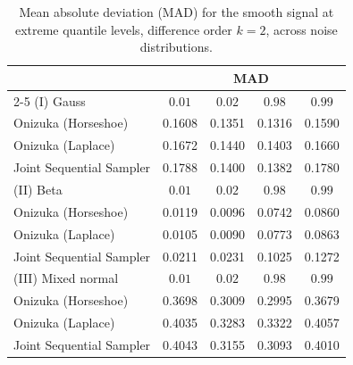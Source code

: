\begin{table}[htbp]
\centering
\caption{Mean absolute deviation (MAD) for the smooth signal at extreme quantile levels, difference order $k = 2$, across noise distributions.}
\label{tab:s_ext_mad}
\begin{tabular}{lcccc}
\toprule
& \multicolumn{4}{c}{MAD} \\
\cmidrule(lr){2-5}
(I) Gauss & $0.01$ & $0.02$ & $0.98$ & $0.99$ \\
\midrule
Onizuka (Horseshoe)      & 0.1608 & 0.1351 & 0.1316 & 0.1590 \\
Onizuka (Laplace)        & 0.1672 & 0.1440 & 0.1403 & 0.1660 \\
Joint Sequential Sampler & 0.1788 & 0.1400 & 0.1382 & 0.1780 \\
\midrule
(II) Beta & $0.01$ & $0.02$ & $0.98$ & $0.99$ \\
\midrule
Onizuka (Horseshoe)      & 0.0119 & 0.0096 & 0.0742 & 0.0860 \\
Onizuka (Laplace)        & 0.0105 & 0.0090 & 0.0773 & 0.0863 \\
Joint Sequential Sampler & 0.0211 & 0.0231 & 0.1025 & 0.1272 \\
\midrule
(III) Mixed normal & $0.01$ & $0.02$ & $0.98$ & $0.99$ \\
\midrule
Onizuka (Horseshoe)      & 0.3698 & 0.3009 & 0.2995 & 0.3679 \\
Onizuka (Laplace)        & 0.4035 & 0.3283 & 0.3322 & 0.4057 \\
Joint Sequential Sampler & 0.4043 & 0.3155 & 0.3093 & 0.4010 \\
\bottomrule
\end{tabular}
\end{table}

